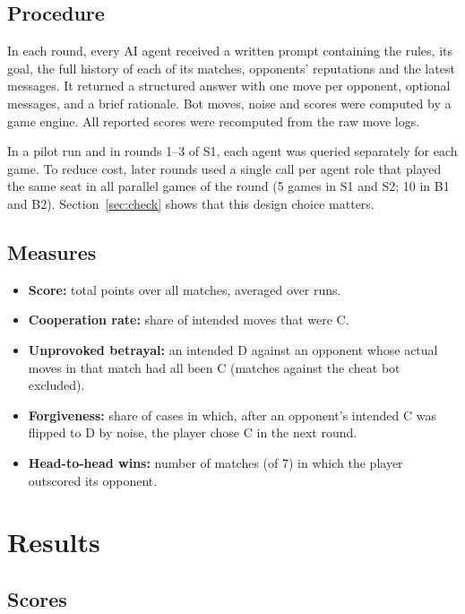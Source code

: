 \documentclass[11pt,a4paper]{article}
\begin{document}
\subsection{Procedure}

In each round, every AI agent received a written prompt containing the rules, its goal, the full history of each of its matches, opponents' reputations and the latest messages. It returned a structured answer with one move per opponent, optional messages, and a brief rationale. Bot moves, noise and scores were computed by a game engine. All reported scores were recomputed from the raw move logs.

In a pilot run and in rounds 1--3 of S1, each agent was queried separately for each game. To reduce cost, later rounds used a single call per agent role that played the same seat in all parallel games of the round (5 games in S1 and S2; 10 in B1 and B2). Section~\ref{sec:check} shows that this design choice matters.

\subsection{Measures}

\begin{itemize}
  \item \textbf{Score:} total points over all matches, averaged over runs.
  \item \textbf{Cooperation rate:} share of intended moves that were C.
  \item \textbf{Unprovoked betrayal:} an intended D against an opponent whose actual moves in that match had all been C (matches against the cheat bot excluded).
  \item \textbf{Forgiveness:} share of cases in which, after an opponent's intended C was flipped to D by noise, the player chose C in the next round.
  \item \textbf{Head-to-head wins:} number of matches (of 7) in which the player outscored its opponent.
\end{itemize}

\section{Results}

\subsection{Scores}
\end{document}
